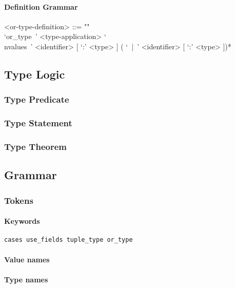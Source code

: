 \documentclass{article}
\begin{document}
\paragraph{Definition Grammar}
\begin{grammar}
<or-type-definition> ::= ""\\
`or_type\ ' <type-application> 
`\\nvalues\ ' <identifier> [ `:' <type> ] ( `\ |\ ' <identifier> [ `:' <type> ])*
\end{grammar}

\subsection{Type Logic}
\label{subsec:typelogic}

\subsubsection{Type Predicate}

\subsubsection{Type Statement}

\subsubsection{Type Theorem}

\subsection{Grammar}
\subsubsection{Tokens}

\paragraph{Keywords}

\begin{verbatim}
cases use_fields tuple_type or_type
\end{verbatim}

\paragraph{Value names}

\paragraph{Type names}
\end{document}
